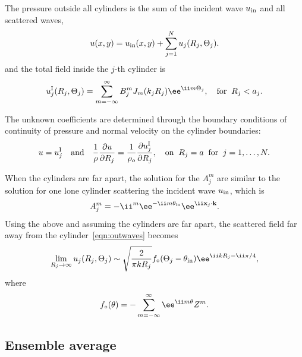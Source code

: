 \documentclass[ 12pt, a4paper]{article}
\begin{document}
The pressure outside all cylinders is the sum of the incident wave $u_{\mathrm{in}}$ and all scattered waves,
\begin{equation}  \label{eq:totwave}
u(x,y) =
  u_{\mathrm{in}}(x,y) +\sum_{j=1}^N u_j(R_j,\Theta_j).
\end{equation} 
and the total field inside the $j$-th cylinder is
\begin{equation} \label{eqn:inwaves}
u_{j}^\In(R_j,\Theta_j) = \sum_{m=-\infty}^\infty B_j^m J_m(k_j R_j) \ee^{\ii m \Theta_j}, \quad \text{for} \;\; R_j < a_j.
\end{equation}

The unknown coefficients are determined through the boundary conditions of continuity of pressure and normal   velocity on the cylinder boundaries:
\begin{equation} \label{eqn:BC}
	u = u^{\mathrm{I}}_{j} \quad \text{and} \quad \frac{1}{\rho} \frac{\partial u}{\partial R_j} = \frac{1}{\rho_o} \frac{\partial u^{\mathrm{I}}_{j}}{\partial R_j}, \quad \text{on} \;\; R_j = a\;\; \text{for} \; \; j=1, \ldots, N.
\end{equation}

When the cylinders are far apart, the solution for the $A_j^m$ are similar to the solution for one lone cylinder scattering the incident wave $u_{\mathrm{in}}$, which is
\begin{equation}
A^m_j = -\ii^m \ee^{-\ii m \theta_\inc} \ee^{\ii \mathbf x_j \cdot \mathbf k}.
\label{eqn:SingleScatterer}
\end{equation}
Using the above and assuming the cylinders are far apart, the scattered field far away from the cylinder~\eqref{eqn:outwaves} becomes
\begin{equation}
    \lim_{R_j \to \infty} u_j(R_j,\Theta_j)
    \sim \sqrt{\frac{2}{\pi k R_j}} f_\circ(\Theta_j-\theta_\inc)\ee^{\ii k R_j -\ii \pi/4},
\end{equation}
where
\begin{equation}
 f_\circ(\theta) = - \sum_{m=-\infty}^\infty \ee^{\ii m \theta} \scatZ^m.
 \label{eqn:FarField}
\end{equation}

\subsection{Ensemble average}
\end{document}
